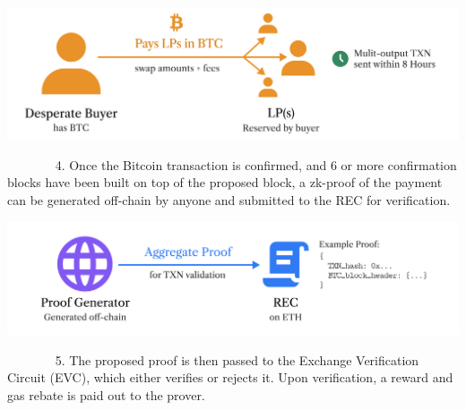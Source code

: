 \documentclass[
]{article}
\begin{document}
{}

{}
{}\vspace*{\baselineskip}
\begin{center}
{\includegraphics[width=5.6in]{images/image1.png}}

\end{center}
{}\vspace*{\baselineskip}

{}

{}


{~ ~ ~ ~ ~4. Once the Bitcoin transaction is confirmed, and 6 or more confirmation
  blocks have been built on top of the proposed block, a zk-proof of the payment can be generated
off-chain by anyone and submitted to the REC for verification.}


{}

{}

{}
{}\vspace*{\baselineskip}

{\includegraphics{images/image6.png}}
{}\vspace*{\baselineskip}

{}

{}


{~ ~ ~ ~ ~5. The proposed proof is then passed to the Exchange Verification
  Circuit (EVC), which either verifies or rejects it. Upon verification, a reward and gas rebate is paid out
to the prover.}

{}

{}
{}\vspace*{\baselineskip}

{}\vspace*{\baselineskip}
\end{document}
